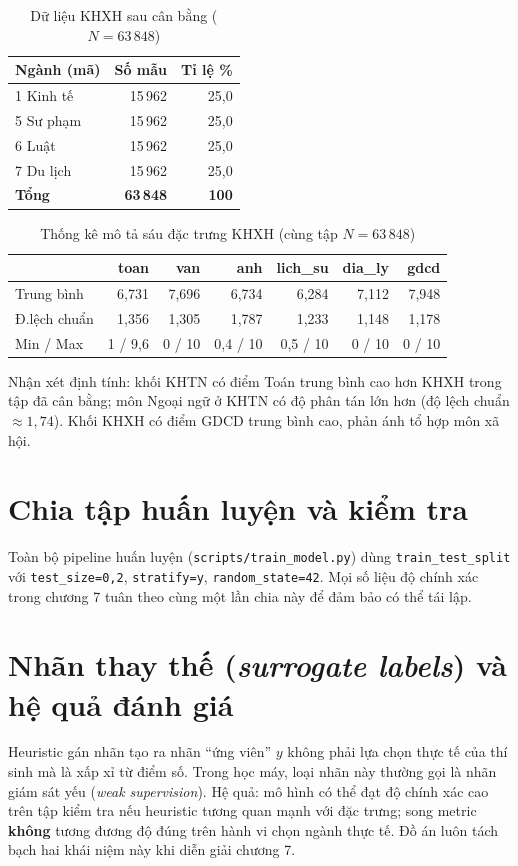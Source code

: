 \begin{table}[htbp]
\centering
\caption{Dữ liệu KHXH sau cân bằng ($N=63\,848$)}
\label{tab:khoixh}
\begin{tabular}{lrr}
\toprule
Ngành (mã) & Số mẫu & Tỉ lệ \% \\
\midrule
1 Kinh tế & 15\,962 & 25{,}0 \\
5 Sư phạm & 15\,962 & 25{,}0 \\
6 Luật & 15\,962 & 25{,}0 \\
7 Du lịch & 15\,962 & 25{,}0 \\
\midrule
\textbf{Tổng} & \textbf{63\,848} & \textbf{100} \\
\bottomrule
\end{tabular}
\end{table}

\begin{table}[!htbp]
\centering
\caption{Thống kê mô tả sáu đặc trưng KHXH (cùng tập $N=63\,848$)}
\begin{tabular}{lrrrrrr}
\toprule
 & toan & van & anh & lich\_su & dia\_ly & gdcd \\
\midrule
Trung bình & 6{,}731 & 7{,}696 & 6{,}734 & 6{,}284 & 7{,}112 & 7{,}948 \\
Đ.lệch chuẩn & 1{,}356 & 1{,}305 & 1{,}787 & 1{,}233 & 1{,}148 & 1{,}178 \\
Min / Max & 1 / 9{,}6 & 0 / 10 & 0{,}4 / 10 & 0{,}5 / 10 & 0 / 10 & 0 / 10 \\
\bottomrule
\end{tabular}
\end{table}
\FloatBarrier

Nhận xét định tính: khối KHTN có điểm Toán trung bình cao hơn KHXH trong tập đã cân bằng; môn Ngoại ngữ ở KHTN có độ phân tán lớn hơn (độ lệch chuẩn $\approx 1{,}74$). Khối KHXH có điểm GDCD trung bình cao, phản ánh tổ hợp môn xã hội.

\section{Chia tập huấn luyện và kiểm tra}
Toàn bộ pipeline huấn luyện (\texttt{scripts/train\_model.py}) dùng \texttt{train\_test\_split} với \texttt{test\_size=0{,}2}, \texttt{stratify=y}, \texttt{random\_state=42}. Mọi số liệu độ chính xác trong chương 7 tuân theo cùng một lần chia này để đảm bảo có thể tái lập.


\section{Nhãn thay thế (\textit{surrogate labels}) và hệ quả đánh giá}
Heuristic gán nhãn tạo ra nhãn ``ứng viên'' $y$ không phải lựa chọn thực tế của thí sinh mà là xấp xỉ từ điểm số. Trong học máy, loại nhãn này thường gọi là nhãn giám sát yếu (\textit{weak supervision}). Hệ quả: mô hình có thể đạt độ chính xác cao trên tập kiểm tra nếu heuristic tương quan mạnh với đặc trưng; song metric \textbf{không} tương đương độ đúng trên hành vi chọn ngành thực tế. Đồ án luôn tách bạch hai khái niệm này khi diễn giải chương 7.

